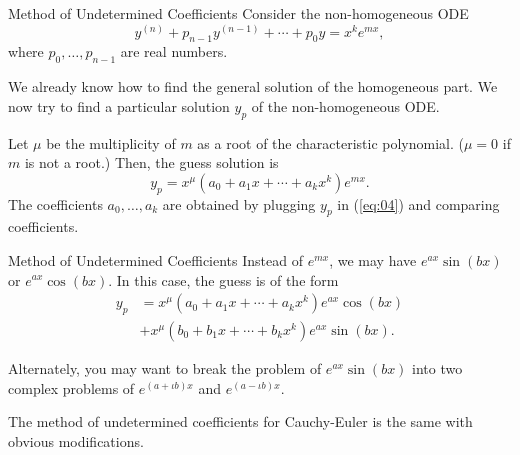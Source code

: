 \documentclass[dvipsnames]{beamer}
\theoremstyle{definition}
\begin{document}
\begin{frame}{Method of Undetermined Coefficients}
  Consider the non-homogeneous ODE
  \begin{equation} \label{eq:04}
    y^{(n)} + p_{n - 1} y^{(n - 1)} + \cdots + p_{0} y = x^{k} e^{mx},
  \end{equation}
  where $p_{0}, \ldots, p_{n - 1}$ are real numbers. \pause

  We already know how to find the general solution of the homogeneous part. \pause We now try to find a particular solution $y_{p}$ of the non-homogeneous ODE. \pause 

  Let $\mu$ be the multiplicity of $m$ as a root of the characteristic polynomial. \pause ($\mu = 0$ if $m$ is not a root.) \pause Then, the guess solution is
  \begin{equation*} 
    y_{p} = x^{\mu}(a_{0} + a_{1} x + \cdots + a_{k} x^{k}) e^{mx}.
  \end{equation*} \pause
  The coefficients $a_{0}, \ldots, a_{k}$ are obtained by plugging $y_{p}$ in (\ref{eq:04}) and comparing coefficients.
\end{frame}
\begin{frame}{Method of Undetermined Coefficients}
  Instead of $e^{mx}$, we may have $e^{ax} \sin(bx)$ or $e^{ax} \cos(bx)$. \pause In this case, the guess is of the form
  \begin{align*} 
    y_{p} &= x^{\mu}(a_{0} + a_{1} x + \cdots + a_{k} x^{k}) e^{ax} \cos(bx) \\
    & + x^{\mu}(b_{0} + b_{1} x + \cdots + b_{k} x^{k}) e^{ax} \sin(bx).
  \end{align*} \pause

  Alternately, you may want to break the problem of $e^{ax} \sin(bx)$ into two complex problems of $e^{(a + \iota b)x}$ and $e^{(a - \iota b)x}$. \pause

  The method of undetermined coefficients for Cauchy-Euler is the same with obvious modifications.
\end{frame}
\end{document}
